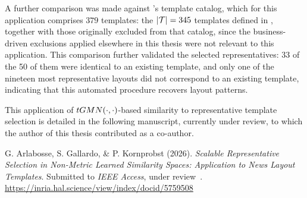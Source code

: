 A further comparison was made against \laprovence's template catalog, which for this application comprises $379$ templates: the $|\mathcal{T}|=345$ templates defined in , together with those originally excluded from that catalog, since the business-driven exclusions applied elsewhere in this thesis were not relevant to this application.
This comparison further validated the selected representatives: 33 of the 50 of them were identical to an existing template, and only one of the nineteen most representative layouts did not correspond to an existing template, indicating that this automated procedure recovers layout patterns.

This application of $tGMN(\cdot, \cdot)$-based similarity to representative template selection is detailed in the following manuscript, currently under review, to which the author of this thesis contributed as a co-author.
\begin{callout}
G. Arlabosse, S. Gallardo, \& P. Kornprobst (2026). \emph{Scalable Representative Selection in Non-Metric Learned Similarity Spaces: Application to News Layout Templates}. Submitted to \emph{IEEE Access}, under review~. \url{https://inria.hal.science/view/index/docid/5759508}
\end{callout}
